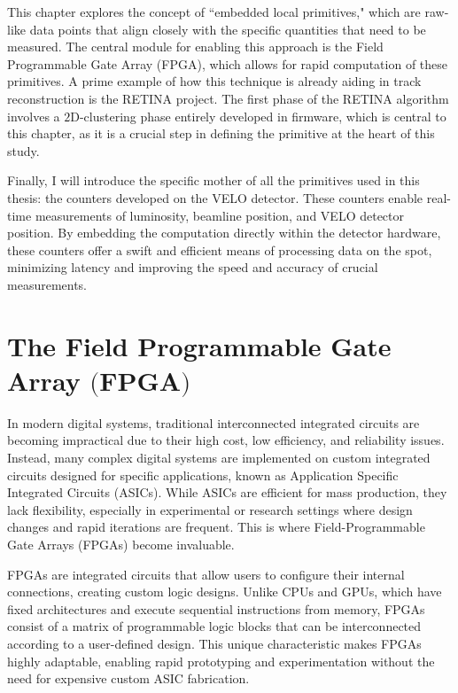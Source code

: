 This chapter explores the concept of ``embedded local primitives," which are raw-like data points that align closely with the specific quantities that need to be measured. The central module for enabling this approach is the Field Programmable Gate Array (FPGA), which allows for rapid computation of these primitives. A prime example of how this technique is already aiding in track reconstruction is the RETINA project. The first phase of the RETINA algorithm involves a $2$D-clustering phase entirely developed in firmware, which is central to this chapter, as it is a crucial step in defining the primitive at the heart of this study.

Finally, I will introduce the specific mother of all the primitives used in this thesis: the counters developed on the VELO detector. These counters enable real-time measurements of luminosity, beamline position, and VELO detector position. By embedding the computation directly within the detector hardware, these counters offer a swift and efficient means of processing data on the spot, minimizing latency and improving the speed and accuracy of crucial measurements. 


\section[The Field Programmable Gate Array]{The Field Programmable Gate Array $\bigl($FPGA$\bigr)$}

In modern digital systems, traditional interconnected integrated circuits are becoming impractical due to their high cost, low efficiency, and reliability issues. Instead, many complex digital systems are implemented on custom integrated circuits designed for specific applications, known as Application Specific Integrated Circuits (ASICs). While ASICs are efficient for mass production, they lack flexibility, especially in experimental or research settings where design changes and rapid iterations are frequent. This is where Field-Programmable Gate Arrays (FPGAs) become invaluable.

FPGAs are integrated circuits that allow users to configure their internal connections, creating custom logic designs. Unlike CPUs and GPUs, which have fixed architectures and execute sequential instructions from memory, FPGAs consist of a matrix of programmable logic blocks that can be interconnected according to a user-defined design. This unique characteristic makes FPGAs highly adaptable, enabling rapid prototyping and experimentation without the need for expensive custom ASIC fabrication.

